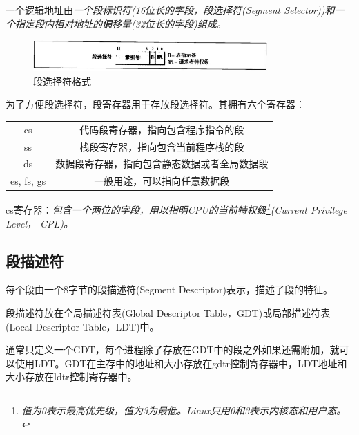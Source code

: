     一个逻辑地址由\emph{一个段标识符(16位长的字段，段选择符(Segment Selector))和一个指定段内相对地址的偏移量(32位长的字段)组成。}

\begin{figure}[!htbp]
    \centering
    \includegraphics[width=0.8\textwidth]{image/chapter02/段选择符格式.png}
    \caption{段选择符格式}
\end{figure}

    为了方便段选择符，段寄存器用于存放段选择符。其拥有六个寄存器：

\begin{table}[!htbp]
    \begin{center}
        \begin{tabular}{c | c}
            cs & 代码段寄存器，指向包含程序指令的段 \\
            ss & 栈段寄存器，指向包含当前程序栈的段 \\
            ds & 数据段寄存器，指向包含静态数据或者全局数据段 \\
            es, fs, gs & 一般用途，可以指向任意数据段 
        \end{tabular}
    \end{center}
\end{table}

    cs寄存器：\emph{包含一个两位的字段，用以指明CPU的当前特权级\footnote[1]{\emph{值为0表示最高优先级，值为3为最低。Linux只用0和3表示内核态和用户态。}}(Current Privilege Level， CPL)。}

\subsection{段描述符}

    每个段由一个8字节的段描述符(Segment Descriptor)表示，描述了段的特征。

    段描述符放在全局描述符表(Global Descriptor Table，GDT)或局部描述符表(Local Descriptor Table，LDT)中。

    通常只定义一个GDT，每个进程除了存放在GDT中的段之外如果还需附加，就可以使用LDT。GDT在主存中的地址和大小存放在gdtr控制寄存器中，LDT地址和大小存放在ldtr控制寄存器中。

